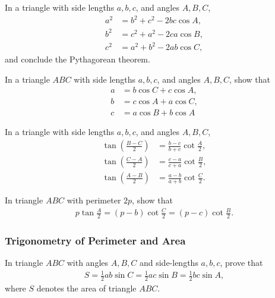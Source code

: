 \documentclass[12pt,a4paper]{memoir}
\theoremstyle{definition}
\begin{document}
	\begin{question}[name=Law of Cosines]
		In a triangle with side lengths $a,b,c$, and angles $A,B,C$,
		\begin{align*}
			a^2 &= b^2 + c^2 - 2bc\cos A,\\
			b^2 &= c^2 + a^2 - 2ca\cos B,\\
			c^2 &= a^2 + b^2 - 2ab\cos C,
		\end{align*}
		and conclude the Pythagorean theorem.
	\end{question}



\begin{question}[name=Projection Rule in Triangle]
	In a triangle $ABC$ with side lengths $a,b,c$, and angles $A,B,C$, show that
	\begin{align*}
		a&=b\cos C + c\cos A,\\
		b&=c\cos A + a\cos C,\\
		c&=a\cos B + b\cos A
	\end{align*}
\end{question}



	\begin{question}[name=Law of Tangents]
		In a triangle with side lengths $a,b,c$, and angles $A,B,C$,
		\begin{align*}
			\tan\left(\frac{B-C}{2}\right) &= \frac{b-c}{b+c}\cot\frac{A}{2},\\
			\tan\left(\frac{C-A}{2}\right) &= \frac{c-a}{c+a}\cot\frac{B}{2},\\
			\tan\left(\frac{A-B}{2}\right) &= \frac{a-b}{a+b}\cot\frac{C}{2}.
		\end{align*}
	\end{question}


\begin{question}
	In triangle $ABC$ with perimeter $2p$, show that
	\begin{align*}
		p\tan\frac{A}{2} = (p-b)\cot\frac{C}{2} = (p-c)\cot\frac{B}{2}.        
	\end{align*}
\end{question}

\subsubsection{Trigonometry of Perimeter and Area}




	\begin{question}[name=Area Using Law of Sines]
		In triangle $ABC$ with angles $A,B,C$ and side-lengths $a,b,c$, prove that
		\begin{align*}
			S = \frac{1}{2} ab \sin C = \frac{1}{2} ac \sin B = \frac{1}{2} bc \sin A,
		\end{align*}
		where $S$ denotes the area of triangle $ABC$.
	\end{question}
\end{document}
